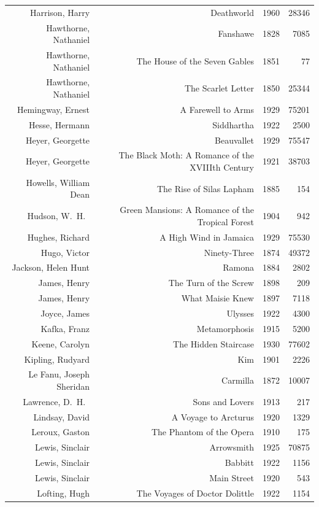\documentclass{article} %
\begin{document}
\begin{center}
\begin{tabularx}{\linewidth}{RRrr}
    Harrison, Harry & Deathworld & 1960 & 28346 \\
    Hawthorne, Nathaniel & Fanshawe & 1828 & 7085 \\
    Hawthorne, Nathaniel & The House of the Seven Gables & 1851 & 77 \\
    Hawthorne, Nathaniel & The Scarlet Letter & 1850 & 25344 \\
    Hemingway, Ernest & A Farewell to Arms & 1929 & 75201 \\
    Hesse, Hermann & Siddhartha & 1922 & 2500 \\
    Heyer, Georgette & Beauvallet & 1929 & 75547 \\
    Heyer, Georgette & The Black Moth: A Romance of the XVIIIth Century & 1921 & 38703 \\
    Howells, William Dean & The Rise of Silas Lapham & 1885 & 154 \\
    Hudson, W.\ H.\ & Green Mansions: A Romance of the Tropical Forest & 1904 & 942 \\
    Hughes, Richard & A High Wind in Jamaica & 1929 & 75530 \\
    Hugo, Victor & Ninety-Three & 1874 & 49372 \\
    Jackson, Helen Hunt & Ramona & 1884 & 2802 \\
    James, Henry & The Turn of the Screw & 1898 & 209 \\
    James, Henry & What Maisie Knew & 1897 & 7118 \\
    Joyce, James & Ulysses & 1922 & 4300 \\
    Kafka, Franz & Metamorphosis & 1915 & 5200 \\
    Keene, Carolyn & The Hidden Staircase & 1930 & 77602 \\
    Kipling, Rudyard & Kim & 1901 & 2226 \\
    Le Fanu, Joseph Sheridan & Carmilla & 1872 & 10007 \\
    Lawrence, D.\ H.\ & Sons and Lovers & 1913 & 217 \\
    Lindsay, David & A Voyage to Arcturus & 1920 & 1329 \\
    Leroux, Gaston & The Phantom of the Opera & 1910 & 175 \\
    Lewis, Sinclair & Arrowsmith & 1925 & 70875 \\
    Lewis, Sinclair & Babbitt & 1922 & 1156 \\
    Lewis, Sinclair & Main Street & 1920 & 543 \\
    Lofting, Hugh & The Voyages of Doctor Dolittle & 1922 & 1154 \\

\end{tabularx}
\end{center}
\end{document}
